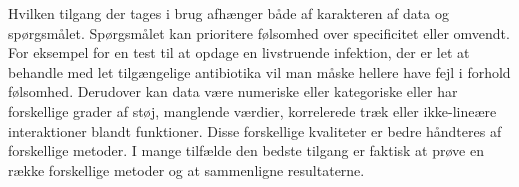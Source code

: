 Hvilken tilgang der tages i brug afhænger både af
karakteren af data og spørgsmålet. Spørgsmålet kan prioritere følsomhed over specificitet eller omvendt. For eksempel for en test til at opdage en livstruende infektion, der er let at behandle med let tilgængelige antibiotika vil man måske hellere have fejl i forhold  følsomhed. Derudover kan data være numeriske eller kategoriske eller har forskellige grader af støj, manglende værdier, korrelerede træk eller ikke-lineære interaktioner blandt funktioner. Disse forskellige kvaliteter er bedre håndteres af forskellige metoder. I mange tilfælde den bedste tilgang er faktisk at prøve en række forskellige metoder og at sammenligne resultaterne.


